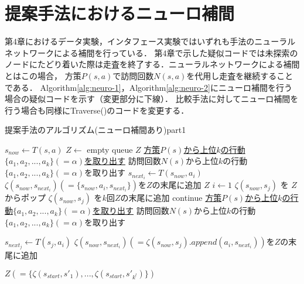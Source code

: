 \section{提案手法におけるニューロ補間}
第4章におけるデータ実験，インタフェース実験ではいずれも手法のニューラルネットワークによる補間を行っている．
第4章で示した疑似コードでは未探索のノードにたどり着いた際は走査を終了する．ニューラルネットワークによる補間とはこの場合，
方策$P(s, a)$で訪問回数$N(s, a)$を代用し走査を継続することである．
Algorithm\ref{alg:neuro-1}，Algorithm\ref{alg:neuro-2}にニューロ補間を行う場合の疑似コードを示す（変更部分に下線）．
比較手法に対してニューロ補間を行う場合も同様にTraverse()のコードを変更する．
\begin{algorithm}
    \caption{提案手法のアルゴリズム(ニューロ補間あり)part1}
    \label{alg:neuro-1}
    \small
    \begin{algorithmic}[1]       
           \State $s_{now} \gets T(s, a)$
           \State $Z \gets $ empty queue
             \Return  $Z$
            \EndIf
             \State \underline{方策$P(s)$から上位$k$の行動$\{a_1, a_2, ..., a_{k}\}(=\alpha)$を取り出す}
            \Else
             \State 訪問回数$N(s)$から上位$k$の行動$\{a_1, a_2, ..., a_{k}\}(=\alpha)$を取り出す
            \EndIf
             \State $s_{{next}_i} \gets T(s_{now}, a_i)$
             \State $\zeta(s_{now},s_{{next}_i})(=\{s_{now}, a_i, s_{{next}_i}\})$を$Z$の末尾に追加
           \EndFor
             \Return $Z$
           \EndIf
           \State $i \gets 1$
                    \State $\zeta(s_{now}, s_{j})$ を $Z$からポップ
                        \State $\zeta(s_{now}, s_{j})$ を$k$回$Z$の末尾に追加
                        \State continue
                    \EndIf
                       \State \underline{方策$P(s)$から上位$k$の行動$\{a_1, a_2, ..., a_{k}\}(=\alpha)$を取り出す}
                   \Else
                    \State 訪問回数$N(s)$から上位$k$の行動$\{a_1, a_2, ..., a_{k}\}(=\alpha)$を取り出す
                   \EndIf
                    
                        \State $s_{{next}_j} \gets T(s_{j}, a_i)$
                        \State $\zeta(s_{now},s_{{next}_i})(=\zeta(s_{now}, s_{j}).append({a_i, s_{{next}_i}}))$を$Z$の末尾に追加
                    \EndFor
                    
                \EndFor     
           \EndWhile
           \Return $Z(=\{\zeta(s_{start}, {s'}_1), ..., \zeta(s_{start}, {s'}_{k^l})\})$
        \EndFunction
    \end{algorithmic}
\end{algorithm}
